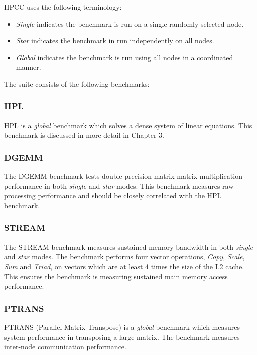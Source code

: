 HPCC uses the following terminology:

\begin{itemize}
\item \emph{Single} indicates the benchmark is run on a single randomly selected node.
\item \emph{Star} indicates the benchmark in run independently on all nodes.
\item \emph{Global} indicates the benchmark is run using all nodes in a coordinated manner.
\end{itemize}

The suite consists of the following benchmarks:


%
%
\subsubsection{HPL}

HPL is a \emph{global} benchmark which solves a dense system of linear equations. This benchmark is discussed in more detail in Chapter 3.


%
%
\subsubsection{DGEMM}

The DGEMM benchmark tests double precision matrix-matrix multiplication performance in both \emph{single} and \emph{star} modes. This benchmark measures raw processing performance and should be closely correlated with the HPL benchmark.


 
%
%
\subsubsection{STREAM}

The STREAM benchmark measures sustained memory bandwidth in both \emph{single} and \emph{star} modes. The benchmark performs four vector operations, \emph{Copy}, \emph{Scale}, \emph{Sum} and \emph{Triad}, on vectors which are at least 4 times the size of the L2 cache. This ensures the benchmark is measuring sustained main memory access performance.

%
%
\subsubsection{PTRANS}

PTRANS (Parallel Matrix Transpose) is a \emph{global} benchmark which measures system performance in transposing a large matrix. The benchmark measures inter-node communication performance.

